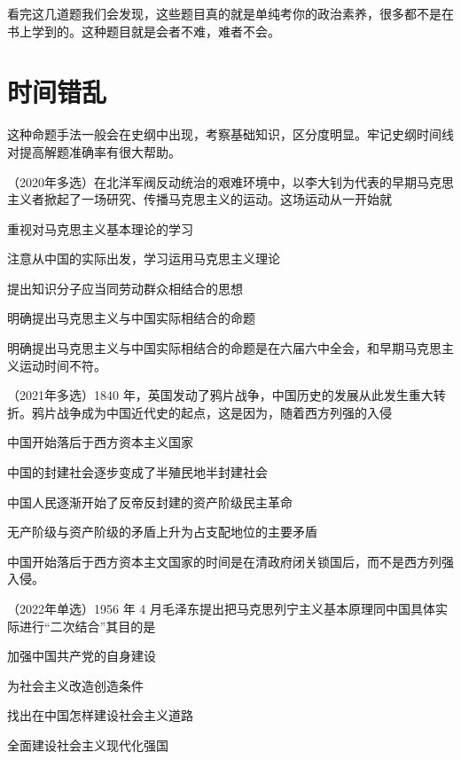 \documentclass[lang=cn,newtx,10pt,scheme=chinese,pad,twocol]{zznote}
\begin{document}
\begin{postulate}
	看完这几道题我们会发现，这些题目真的就是单纯考你的政治素养，很多都不是在书上学到的。这种题目就是会者不难，难者不会。

\end{postulate}
\section{时间错乱}
\begin{definition}
	这种命题手法一般会在史纲中出现，考察基础知识，区分度明显。牢记史纲时间线对提高解题准确率有很大帮助。
\end{definition}


\begin{example}
	（2020年多选）在北洋军阀反动统治的艰难环境中，以李大钊为代表的早期马克思主义者掀起了一场研究、传播马克思主义的运动。这场运动从一开始就
	\begin{choice}
		\item 重视对马克思主义基本理论的学习
		\item 注意从中国的实际出发，学习运用马克思主义理论
		\item 提出知识分子应当同劳动群众相结合的思想
		\item 明确提出马克思主义与中国实际相结合的命题
	\end{choice}
\end{example}
\begin{solution}
	明确提出马克思主义与中国实际相结合的命题是在六届六中全会，和早期马克思主义运动时间不符。
\end{solution}
\begin{example}
	（2021年多选）1840 年，英国发动了鸦片战争，中国历史的发展从此发生重大转折。鸦片战争成为中国近代史的起点，这是因为，随着西方列强的入侵
	\begin{choice}
		\item 中国开始落后于西方资本主义国家
		\item 中国的封建社会逐步变成了半殖民地半封建社会
		\item 中国人民逐渐开始了反帝反封建的资产阶级民主革命
		\item 无产阶级与资产阶级的矛盾上升为占支配地位的主要矛盾
	\end{choice}
\end{example}
\begin{solution}
	中国开始落后于西方资本主文国家的时间是在清政府闭关锁国后，而不是西方列强入侵。
\end{solution}
\begin{example}
	（2022年单选）1956 年 4 月毛泽东提出把马克思列宁主义基本原理同中国具体实际进行“二次结合”其目的是
	\begin{choice}
		\item 加强中国共产党的自身建设
		\item 为社会主义改造创造条件
		\item 找出在中国怎样建设社会主义道路
		\item 全面建设社会主义现代化强国
	\end{choice}
\end{example}
\end{document}
